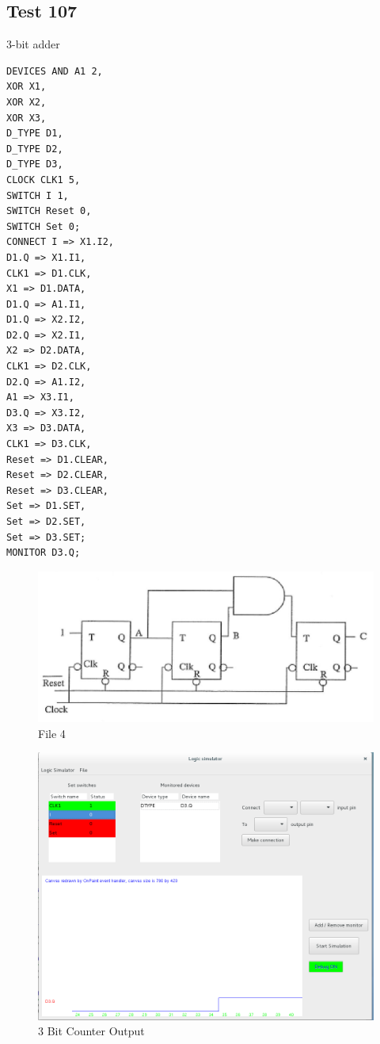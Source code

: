 \documentclass[12pt]{article}
\begin{document}
\subsection{Test 107}
3-bit adder\\
\begin{verbatim}
DEVICES	AND A1 2,
XOR X1,
XOR X2,
XOR X3,
D_TYPE D1,
D_TYPE D2,
D_TYPE D3,
CLOCK CLK1 5,
SWITCH I 1,
SWITCH Reset 0,
SWITCH Set 0;
CONNECT	I => X1.I2,
D1.Q => X1.I1,
CLK1 => D1.CLK,
X1 => D1.DATA,
D1.Q => A1.I1,
D1.Q => X2.I2,
D2.Q => X2.I1,
X2 => D2.DATA,
CLK1 => D2.CLK,
D2.Q => A1.I2,
A1 => X3.I1,
D3.Q => X3.I2,
X3 => D3.DATA,
CLK1 => D3.CLK,
Reset => D1.CLEAR,
Reset => D2.CLEAR,
Reset => D3.CLEAR,
Set => D1.SET,
Set => D2.SET,
Set => D3.SET;
MONITOR	D3.Q;
\end{verbatim}
\begin{figure}[H]
	\centering
	\includegraphics[width=0.9\linewidth]{figures/test107.png}
	\captionsetup{width=.7\linewidth}
	\caption{File 4}
	\label{fig:6}
\end{figure}

\begin{figure}[H]
	\centering
	\includegraphics[width=0.9\linewidth]{figures/test107_GUI.png}
	\captionsetup{width=.7\linewidth}
	\caption{3 Bit Counter Output}
	\label{fig:7}
\end{figure}
\end{document}
